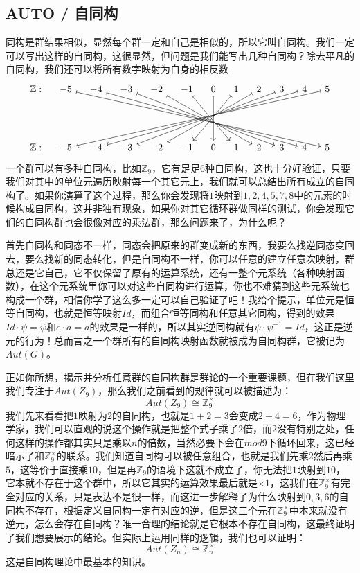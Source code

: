 \documentclass[UTF8]{ctexbook}
\begin{document}
\subsection{AUTO / 自同构}
同构是群结果相似，显然每个群一定和自己是相似的，所以它叫自同构。我们一定可以写出这样的自同构，这很显然，但问题是我们能写出几种自同构？除去平凡的自同构，我们还可以将所有数字映射为自身的相反数
\[
\begin{tikzcd}[column sep=1em, row sep=4.5em]
\mathbb{Z}:
& -5 \arrow[drrrrrrrrrr,mapsto]
& -4 \arrow[drrrrrrrr,mapsto]
& -3 \arrow[drrrrrr,mapsto]
& -2  \arrow[drrrr,mapsto]
& -1  \arrow[drr,mapsto]
&  0 \arrow[d,mapsto]
&  1 \arrow[dll,mapsto]
&  2 \arrow[dllll,mapsto]
&  3 \arrow[dllllll,mapsto]
&  4 \arrow[dllllllll,mapsto]
&  5 \arrow[dllllllllll,mapsto]
\\
\mathbb{Z}:
& -5
& -4
& -3
& -2 
& -1 
&  0
&  1
&  2 
&  3 
&  4 
&  5 
\end{tikzcd}
\]
一个群可以有多种自同构，比如$\mathbb{Z}_{9}$，它有足足6种自同构，这也十分好验证，只要我们对其中的单位元遍历映射每一个其它元上，我们就可以总结出所有成立的自同构了。如果你演算了这个过程，那么你会发现将$1$映射到${1,2,4,5,7,8}$中的元素的时候构成自同构，这并非独有现象，如果你对其它循环群做同样的测试，你会发现它们的自同构群也会很像对应的乘法群，那么问题来了，为什么呢？

首先自同构和同态不一样，同态会把原来的群变成新的东西，我要么找逆同态变回去，要么找新的同态转化，但是自同构不一样，你可以任意的建立任意次映射，群总还是它自己，它不仅保留了原有的运算系统，还有一整个元系统（各种映射函数），在这个元系统里你可以对这些自同构进行运算，你也不难猜到这些元系统也构成一个群，相信你学了这么多一定可以自己验证了吧！我给个提示，单位元是恒等自同构，也就是恒等映射$Id$，而组合恒等同构和任意其它同构，得到的效果$Id \cdot \psi = \psi$和$e \cdot a =a$的效果是一样的，所以其实逆同构就有$\psi \cdot \psi^{-1} = Id$，这正是逆元的行为！总而言之一个群所有的自同构映射函数就被成为自同构群，它被记为$Aut(G)$。

正如你所想，揭示并分析任意群的自同构群是群论的一个重要课题，但在我们这里我们专注于$Aut(Z_9)$，那么我们之前看到的规律就可以被描述为：
\[
Aut(Z_9) \cong \mathbb{Z}_{9}^{\times}
\]
我们先来看看把$1$映射为$2$的自同构，也就是$1+2=3$会变成$2+4=6$，作为物理学家，我们可以直观的说这个操作就是把整个式子乘了$2$倍，而$2$没有特别之处，任何这样的操作都其实只是乘以$n$的倍数，当然必要下会在$mod9$下循环回来，这已经暗示了和$\mathbb{Z}_{9}^{\times}$的联系。我们知道自同构可以被任意组合，也就是我们先乘$2$然后再乘$5$，这等价于直接乘$10$，但是再$\mathbb{Z}_{9}$的语境下这就不成立了，你无法把$1$映射到$10$，它本就不存在于这个群中，所以它其实的运算效果最后就是$\times 1$，这我们在$\mathbb{Z}_{9}^{\times}$有完全对应的关系，只是表达不是很一样，而这进一步解释了为什么映射到${0,3,6}$的自同构不存在，根据定义自同构一定有对应的逆，但是这三个元在$\mathbb{Z}_{9}^{\times}$中本来就没有逆元，怎么会存在自同构？唯一合理的结论就是它根本不存在自同构，这最终证明了我们想要展示的结论。但实际上运用同样的逻辑，我们也可以证明：
\[
Aut(Z_n) \cong \mathbb{Z}_{n}^{\times}
\]
这是自同构理论中最基本的知识。
\end{document}
